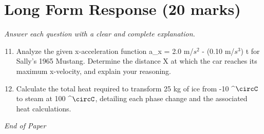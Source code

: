 \documentclass[12pt]{article}
\begin{document}
\section*{Long Form Response (20 marks)}
\textit{Answer each question with a clear and complete explanation.}
\begin{enumerate}[label=\arabic*.]
\setcounter{enumi}{10}
\item Analyze the given x-acceleration function a\_x = 2.0 m/$s^2$ - (0.10 m/$s^3$) t for Sally's 1965 Mustang. Determine the distance X at which the car reaches its maximum x-velocity, and explain your reasoning.
\item Calculate the total heat required to transform 25 kg of ice from -10 ^\ensuremath{\circC} to steam at 100 ^\ensuremath{\circC}, detailing each phase change and the associated heat calculations.
\end{enumerate}

\vfill
\noindent\textit{End of Paper}
\end{document}
